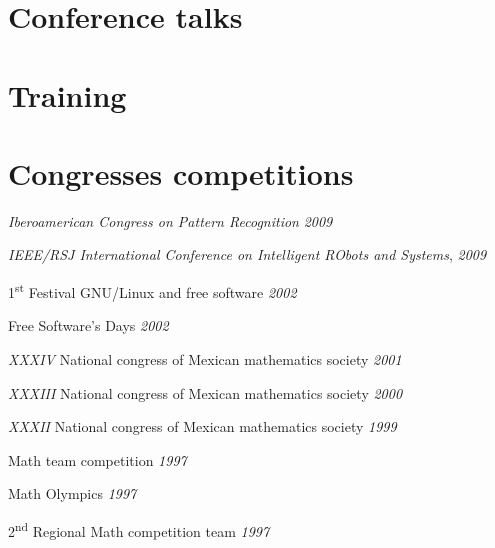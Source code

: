 \section{Conference talks}


\section{Training}


\section{Congresses competitions} \begin{loneinnerlist}
  \item \emph{Iberoamerican Congress on Pattern Recognition} \hfill{\emph{2009}}
  \item \emph{IEEE/RSJ International Conference on Intelligent RObots
        and Systems}, \hfill{\emph{2009}}
  \item 1\textsuperscript{st} Festival GNU/Linux and free software 
        \hfill{\emph{2002}}
  \item Free Software's Days \hfill{\emph{2002}}
  \item \emph{XXXIV} National congress of Mexican mathematics society
        \hfill{\emph{2001}}
  \item \emph{XXXIII} National congress of Mexican mathematics society
        \hfill{\emph{2000}}
  \item \emph{XXXII} National congress of Mexican mathematics society
        \hfill{\emph{1999}}
  \item Math team competition \hfill{\emph{1997}}
  \item Math Olympics \hfill{\emph{1997}}
  \item 2\textsuperscript{nd} Regional Math competition team 
        \hfill{\emph{1997}}
\end{loneinnerlist}




